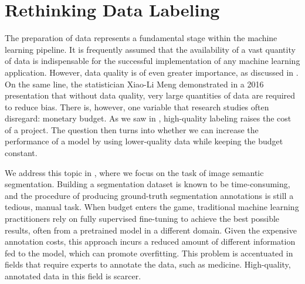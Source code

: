 
\section{Rethinking Data Labeling}
\label{sec:disc_fullweak}

The preparation of data represents a fundamental stage within the machine learning pipeline. It is frequently assumed that the availability of a vast quantity of data is indispensable for the successful implementation of any machine learning application. However, data quality is of even greater importance, as discussed in . On the same line, the statistician Xiao-Li Meng demonstrated in a 2016 presentation that without data quality, very large quantities of data are required to reduce bias. There is, however, one variable that research studies often disregard: monetary budget. As we saw in , high-quality labeling raises the cost of a project. The question then turns into whether we can increase the performance of a model by using lower-quality data while keeping the budget constant.

We address this topic in , where we focus on the task of image semantic segmentation. Building a segmentation dataset is known to be time-consuming, and the procedure of producing ground-truth segmentation annotations is still a tedious, manual task. When budget enters the game, traditional machine learning practitioners rely on fully supervised fine-tuning to achieve the best possible results, often from a pretrained model in a different domain. Given the expensive annotation costs, this approach incurs a reduced amount of different information fed to the model, which can promote overfitting. This problem is accentuated in fields that require experts to annotate the data, such as medicine. High-quality, annotated data in this field is scarcer.

